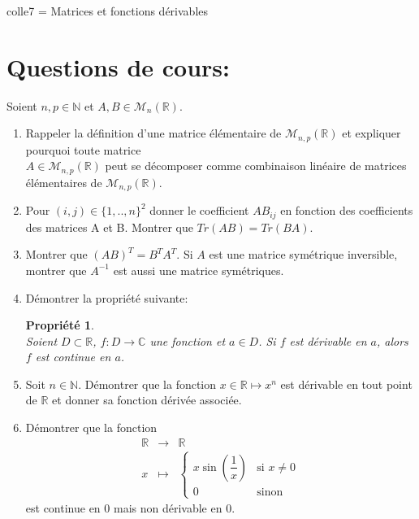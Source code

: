 \documentclass[a4paper,10pt]{article}
\newtheorem*{pro}{Propriété}
\theoremstyle{definition}
\theoremstyle{definition}
\newcommand{\C}{\mathbb{C}}
\newcommand{\R}{\mathbb{R}}
\newcommand{\N}{\mathbb{N}}
\begin{document}
	
	
	\begin{center}
		\Large \sc colle7 =  Matrices et fonctions dérivables
	\end{center}
	
\section *{Questions de cours:}

\noindent Soient $n,p\in\N$ et  $A,B\in\mathcal{M}_{n}\left(\R\right)$.
\begin{enumerate} 
\item Rappeler la définition d'une matrice élémentaire de  $\mathcal{M}_{n,p}\left(\R\right)$ et expliquer pourquoi toute matrice\\ $A\in\mathcal{M}_{n,p}\left(\R\right)$ peut se décomposer comme combinaison linéaire de matrices élémentaires de $\mathcal{M}_{n,p}\left(\R\right)$.
\item  Pour $(i,j)\in\{1,..,n\}^2$ donner le coefficient $AB_{ij}$ en fonction des coefficients des matrices A et B. Montrer que $Tr(AB) = Tr(BA)$.  
\item Montrer que $(AB)^T=B^TA^T$. Si $A$ est une matrice symétrique inversible, montrer que $A^{-1}$ est aussi une matrice symétriques. 
\item Démontrer la propriété suivante:
\begin{pro}\hfil\\
Soient $D\subset\R$, $f:D\rightarrow\C$ une fonction et $a\in D$. Si $f$ est dérivable en $a$, alors $f$ est continue en $a$.
\end{pro}
\item Soit $n\in\N$. Démontrer que la fonction $x \in\R \mapsto x^n$ est dérivable en tout point de $\R$ et donner sa fonction dérivée associée. 
\item Démontrer que la fonction $$\begin{array}{ccl}
\R & \rightarrow & \R\\
x & \longmapsto & \left\{\begin{array}{cl}
x\sin\left(\dfrac{1}{x}\right) & \text{si } x\neq 0\\
0& \text{sinon}
\end{array}\right.
\end{array}$$
\noindent est continue en $0$ mais non dérivable en $0$.
\end{enumerate}
\end{document}
